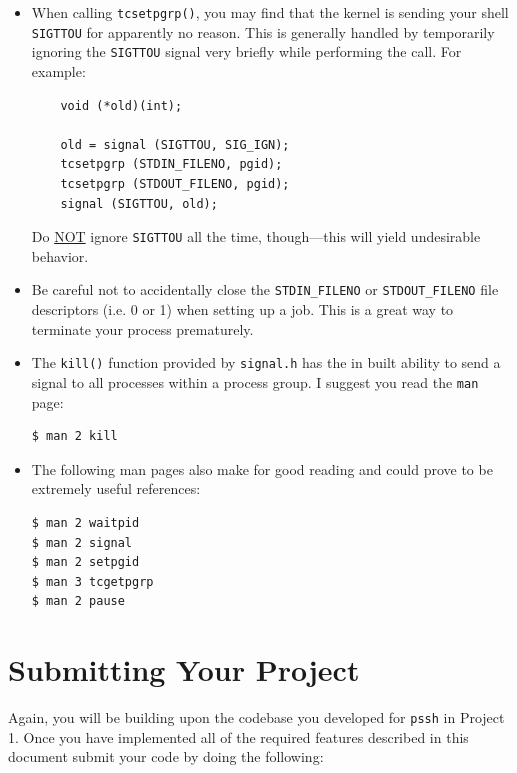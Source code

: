 \documentclass[10pt]{article}
\begin{document}
\begin{itemize}

    \item When calling \texttt{tcsetpgrp()}, you may find that the
        kernel is sending your shell \texttt{SIGTTOU} for apparently no
        reason.  This is generally handled by temporarily ignoring the
        \texttt{SIGTTOU} signal very briefly while performing the call.
        For example:

\begin{verbatim}
    void (*old)(int);

    old = signal (SIGTTOU, SIG_IGN);
    tcsetpgrp (STDIN_FILENO, pgid);
    tcsetpgrp (STDOUT_FILENO, pgid);
    signal (SIGTTOU, old);
\end{verbatim}

    Do \underline{NOT} ignore \texttt{SIGTTOU} all the time,
    though---this will yield undesirable behavior.


\item Be careful not to accidentally close the \texttt{STDIN\_FILENO} or
    \texttt{STDOUT\_FILENO} file descriptors (i.e. 0 or 1) when setting
    up a job.  This is a great way to terminate your process
    prematurely.

\item The \texttt{kill()} function provided by \texttt{signal.h} has the
    in built ability to send a signal to all processes within a process
    group.  I suggest you read the \texttt{man} page:

\begin{verbatim}
$ man 2 kill
\end{verbatim}

\item The following man pages also make for good reading and could prove
    to be extremely useful references:

\begin{verbatim}
$ man 2 waitpid
$ man 2 signal
$ man 2 setpgid
$ man 3 tcgetpgrp
$ man 2 pause
\end{verbatim}

\end{itemize}


\section{Submitting Your Project}

Again, you will be building upon the codebase you developed for
\texttt{pssh} in Project 1.  Once you have implemented all of the
required features described in this document submit your code by doing
the following:
\end{document}
